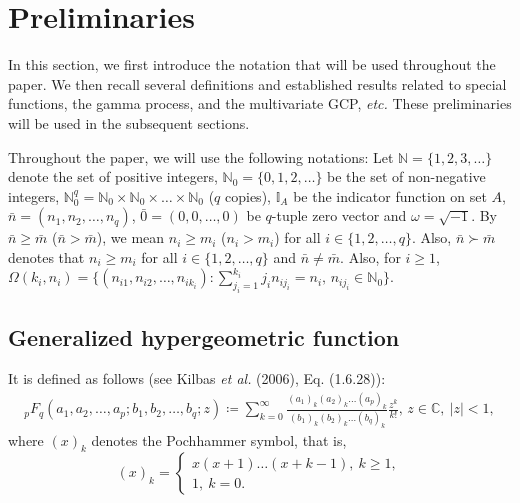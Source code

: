 \documentclass[12pt,oneside,reqno]{amsart}
\numberwithin{equation}{section}
\theoremstyle{definition}
\numberwithin{equation}{section}
\theoremstyle{remarkstyle}
\begin{document}
\section{Preliminaries}
In this section, we first introduce the notation that will be used throughout the paper. We then recall several definitions and established results related to special functions, the gamma process, and the multivariate GCP, \textit{etc.} These preliminaries will be used in the subsequent sections.

Throughout the paper, we will use the following notations: Let $\mathbb{N}=\{1,2,3,\dots\}$ denote the set of positive integers, $\mathbb{N}_{0}=\{0,1,2,\dots\}$ be the set of non-negative integers, $\mathbb{N}_{0}^q=\mathbb{N}_{0}\times\mathbb{N}_{0}\times\dots\times\mathbb{N}_{0}$ ($q$ copies), $\mathbb{I}_{A}$ be the indicator function on set $A$,   $\bar{n}=(n_1,n_2,\dots,n_q)$, $\bar{0}=(0,0,\dots,0)$ be $q$-tuple zero vector and $\omega=\sqrt{-1}$. By $\bar{n}\ge \bar{m}$ ($\bar{n}> \bar{m}$), we mean $n_i\ge m_i$ ($n_i> m_i$) for all $i\in \{1,2,\dots,q\}$. Also, $\bar{n}\succ \bar{m}$ denotes that $n_i\ge m_i$ for all $i\in\{1,2,\dots,q\}$ and $\bar{n}\neq \bar{m}$. Also, for $i\ge1$,  $\Omega(k_i,n_i)=\big\{(n_{i1}, n_{i2}, \dots, n_{ik_i}):\sum_{j_i=1}^{k_i}j_in_{ij_i}=n_i,\, n_{ij_i}\in \mathbb{N}_{0}\big\}$.



\subsection{Generalized hypergeometric function}
It is defined as follows (see Kilbas \textit{et al.} (2006), Eq. (1.6.28)):
\begin{equation*}
	\begin{aligned}\label{GenHyp}
		_pF_q(a_1,a_2,\dots,a_p; b_1,b_2,\dots,b_q;z)\coloneqq\sum_{k=0}^{\infty}\frac{(a_1)_k(a_2)_k\dots(a_p)_k}{(b_1)_k(b_2)_k\dots(b_q)_k}\frac{z^k}{k!},\, z\in\mathbb{C},\ |z|<1,
	\end{aligned}
\end{equation*}
where $(x)_k$ denotes the Pochhammer symbol, that is,
\begin{equation}\label{pochha}
		(x)_k =\begin{cases*}
			x(x+1)\dots(x+k-1), \  k\ge1,\\
			1, \  k=0. 
		\end{cases*}
\end{equation}
\end{document}
